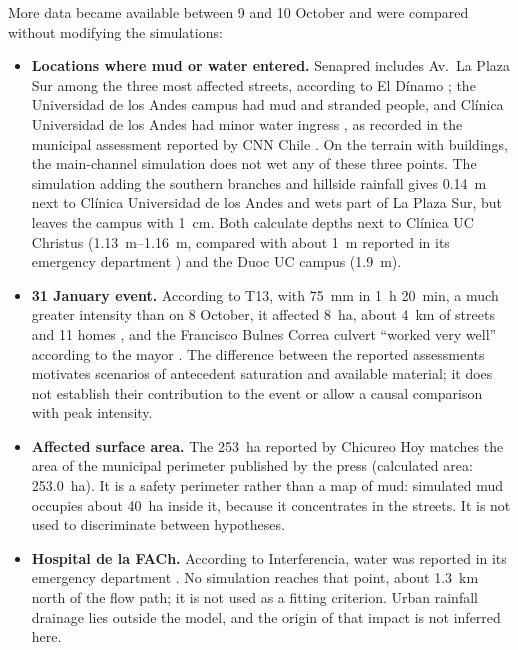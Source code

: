 More data became available between 9 and 10 October and were compared without modifying the simulations:
\begin{itemize}
\item \textbf{Locations where mud or water entered.} Senapred includes Av.\ La Plaza Sur among the three most affected streets, according to El Dínamo \citep{eldinamo2026}; the Universidad de los Andes campus had mud and stranded people, and Clínica Universidad de los Andes had minor water ingress \citep{interferencia2026,cooperativa2026}, as recorded in the municipal assessment reported by CNN Chile \citep{cnnchile2026balance}. On the terrain with buildings, the main-channel simulation does not wet any of these three points. The simulation adding the southern branches and hillside rainfall gives \SI{0.14}{m} next to Clínica Universidad de los Andes and wets part of La Plaza Sur, but leaves the campus with \SI{1}{cm}. Both calculate depths next to Clínica UC Christus (\SIrange{1.13}{1.16}{m}, compared with about \SI{1}{m} reported in its emergency department \citep{cadena3_2026}) and the Duoc UC campus (\SI{1.9}{m}).
\item \textbf{31 January event.} According to T13, with \SI{75}{mm} in \SI{1}{h} \SI{20}{min}, a much greater intensity than on 8 October, it affected \SI{8}{ha}, about \SI{4}{km} of streets and 11 homes \citep{t13_2026mallas}, and the Francisco Bulnes Correa culvert ``worked very well'' according to the mayor \citep{latercera2026enero}. The difference between the reported assessments motivates scenarios of antecedent saturation and available material; it does not establish their contribution to the event or allow a causal comparison with peak intensity.
\item \textbf{Affected surface area.} The \SI{253}{ha} reported by Chicureo Hoy \citep{chicureohoy2026} matches the area of the municipal perimeter published by the press (calculated area: \SI{253.0}{ha}). It is a safety perimeter rather than a map of mud: simulated mud occupies about \SI{40}{ha} inside it, because it concentrates in the streets. It is not used to discriminate between hypotheses.
\item \textbf{Hospital de la FACh.} According to Interferencia, water was reported in its emergency department \citep{interferencia2026}. No simulation reaches that point, about \SI{1.3}{km} north of the flow path; it is not used as a fitting criterion. Urban rainfall drainage lies outside the model, and the origin of that impact is not inferred here.
\end{itemize}

